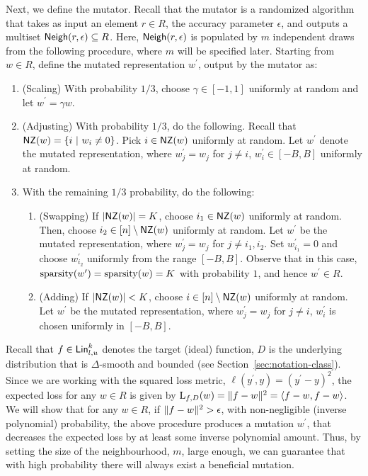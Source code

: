 Next, we define the mutator. Recall that the mutator is a randomized algorithm
that takes as input an element $r \in R$, the accuracy parameter $\epsilon$,
and outputs a multiset $\mathsf{Neigh}(r, \epsilon) \subseteq R$. Here, $\mathsf{Neigh}(r,
\epsilon)$ is populated by $m$ independent draws from the following procedure,
where $m$ will be specified later. Starting from $w \in R$, define the mutated
representation $w^\prime$, output by the mutator as:
\begin{enumerate}
%
\item (Scaling) With probability $1/3$, choose $\gamma \in [-1, 1]$ uniformly at
random and let $w^\prime = \gamma w$. 
%
\item (Adjusting) With probability $1/3$, do the following. Recall that $\mathsf{NZ}(w)
= \{ i~|~ w_i \neq 0 \}$. Pick $i \in \mathsf{NZ}(w)$ uniformly at random. Let
$w^\prime$ denote the mutated representation, where $w^\prime_j = w_j$ for $j
\neq i$, $w^\prime_i \in [-B, B]$ uniformly at random. 
%
\item With the remaining $1/3$ probability, do the following:
\begin{enumerate}
\item (Swapping) If $|\mathsf{NZ}(w)| = K$, choose $i_1 \in \mathsf{NZ}(w)$ uniformly at random.
Then, choose $i_2 \in [n] \setminus \mathsf{NZ}(w)$ uniformly at random. Let $w^\prime$
be the mutated representation, where $w_j^\prime = w_j$ for $j \neq i_1, i_2$.
Set $w_{i_1}^\prime = 0$ and choose $w_{i_2}^\prime$ uniformly from the range
$[-B, B]$. Observe that in this case, $\mathrm{sparsity}(w^\prime) = \mathrm{sparsity}(w) = K$
with probability $1$, and hence $w^\prime \in R$.
\item (Adding) If $|\mathsf{NZ}(w)| < K$, choose $i \in [n] \setminus \mathsf{NZ}(w)$ uniformly
at random. Let $w^\prime$ be the mutated representation, where $w_j^\prime =
w_j$ for $j \neq i$, $w^\prime_i$ is chosen uniformly in $[-B, B]$. 
\end{enumerate}
\end{enumerate}

Recall that $f \in \mathsf{Lin}^k_{l, u}$ denotes the target (ideal) function, $D$ is
the underlying distribution that is $\Delta$-smooth and bounded (see
Section~\ref{sec:notation-class}). Since we are working with the squared loss
metric, $\ell(y^\prime, y) = (y^\prime - y)^2$, the expected loss for any $w \in
R$ is given by $\mathrm{L}_{f, D}(w) = \Vert f - w \Vert^2 = \langle f - w, f - w \rangle$.  We
will show that for any $w \in R$, if $\Vert f - w \Vert^2 > \epsilon$, with
non-negligible (inverse polynomial) probability, the above procedure produces a
mutation $w^\prime$, that decreases the expected loss by at least some inverse
polynomial amount. Thus, by setting the size of the neighbourhood, $m$, large
enough, we can guarantee that with high probability there will always exist a
beneficial mutation.
%

